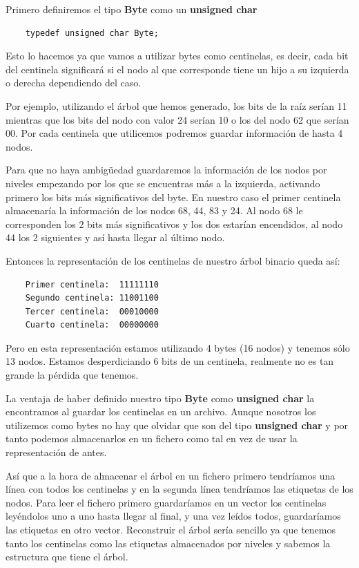 \documentclass{article}
\begin{document}
\newpage
\begin{flushleft}
  Primero definiremos el tipo \textbf{Byte} como un \textbf{unsigned char}
  \begin{lstlisting}
    typedef unsigned char Byte;
  \end{lstlisting}
  Esto lo hacemos ya que vamos a utilizar bytes como centinelas, es decir, cada bit
  del centinela significará si el nodo al que corresponde tiene un hijo a su izquierda o
  derecha dependiendo del caso.

  Por ejemplo, utilizando el árbol que hemos generado, los bits de la raíz serían 11 mientras que los
  bits del nodo con valor 24 serían 10 o los del nodo 62 que serían 00.
  Por cada centinela que utilicemos podremos guardar información de hasta 4 nodos.

  \vspace{\baselineskip}
  Para que no haya ambigüedad guardaremos la información de los nodos por niveles empezando por los
  que se encuentras más a la izquierda, activando primero los bits más significativos del byte.
  En nuestro caso el primer centinela almacenaría la información de los nodos 68, 44, 83 y 24.
  Al nodo 68 le corresponden los 2 bits más significativos y los dos estarían encendidos,
  al nodo 44 los 2 siguientes y así hasta llegar al último nodo. \vspace{\baselineskip}

  Entonces la representación de los centinelas de nuestro árbol binario queda así:
  \begin{lstlisting}
    Primer centinela:  11111110
    Segundo centinela: 11001100
    Tercer centinela:  00010000
    Cuarto centinela:  00000000
  \end{lstlisting}

  Pero en esta representación estamos utilizando 4 bytes (16 nodos) y tenemos sólo 13 nodos.
  Estamos desperdiciando 6 bits de un centinela, realmente no es tan grande la pérdida que tenemos.

  \vspace{\baselineskip}
  La ventaja de haber definido nuestro tipo \textbf{Byte} como \textbf{unsigned char} la encontramos al guardar los centinelas
  en un archivo. Aunque nosotros los utilizemos como bytes no hay que olvidar que son del tipo \textbf{unsigned char}
  y por tanto podemos almacenarlos en un fichero como tal en vez de usar la representación de antes.
  \vspace{\baselineskip}

  Así que a la hora de almacenar el árbol en un fichero primero tendríamos una línea con todos los centinelas
  y en la segunda línea tendríamos las etiquetas de los nodos. \break
  Para leer el fichero primero guardaríamos en un vector los centinelas leyéndolos uno a uno
  hasta llegar al final, y una vez leídos todos, guardaríamos las etiquetas en otro vector. \break
  Reconstruir el árbol sería sencillo ya que tenemos tanto los centinelas como las etiquetas almacenados por
  niveles y sabemos la estructura que tiene el árbol.


\end{flushleft}
\end{document}
